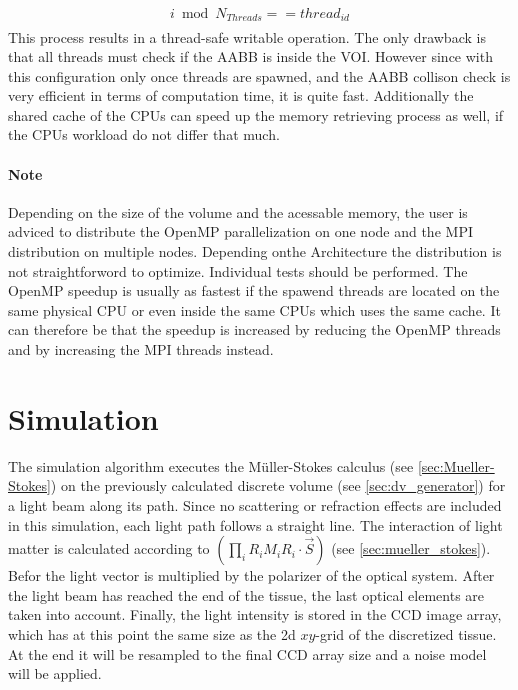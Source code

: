 %
\begin{align}
\begin{split}
    i \bmod N_{\mathit{Threads}} == \mathit{thread}_{\mathit{id}}
\end{split}
\end{align}
%
This process results in a thread-safe writable operation.
The only drawback is that all threads must check if the \ac{AABB} is inside the \ac{VOI}.
However since with this configuration only once threads are spawned, and the \ac{AABB} collison check is very efficient in terms of computation time, it is quite fast.
Additionally the shared cache of the \acp{CPU} can speed up the memory retrieving process as well, if the \acp{CPU} workload do not differ that much.
\par
\paragraph{Note}
Depending on the size of the volume and the acessable memory, the user is adviced to distribute the \ac{OpenMP} parallelization on one node and the \ac{MPI} distribution on multiple nodes. Depending onthe Architecture the distribution is not straightforword to optimize. Individual tests should be performed.
The \ac{OpenMP} speedup is usually as fastest if the spawend threads are located on the same physical \ac{CPU} or even inside the same \acp{CPU} which uses the same cache.
It can therefore be that the speedup is increased by reducing the \ac{OpenMP} threads and by increasing the \ac{MPI} threads instead.
%
%
%
\section{Simulation}
\label{sec:simulation}
%
The simulation algorithm executes the M\"uller-Stokes calculus (see \cref{sec:Mueller-Stokes}) on the previously calculated discrete volume (see \cref{sec:dv_generator}) for a light beam along its path.
Since no scattering or refraction effects are included in this simulation, each light path follows a straight line.
The interaction of light matter is calculated according to $\left( \prod_i R_i M_i R_i \cdot \vec{S} \right)$ (see \cref{sec:mueller_stokes}).
Befor the light vector is multiplied by the polarizer of the optical system.
After the light beam has reached the end of the tissue, the last optical elements are taken into account.
Finally, the light intensity is stored in the \acs{CCD} image array, which has at this point the same size as the 2d $xy$-grid of the discretized tissue.
At the end it will be resampled to the final \ac{CCD} array size and a noise model will be applied.
%
%
